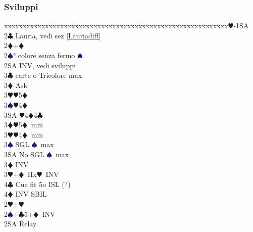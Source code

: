 \documentclass[a4paper,italian]{article}
\newcommand{\BC}{\textcolor{OliveGreen}{$\clubsuit$}}
\newcommand{\BD}{\textcolor{RedOrange}{$\vardiamondsuit$}}
\newcommand{\BH}{\textcolor{Red2}{$\varheartsuit${}}}
\newcommand{\BS}{\textcolor{MidnightBlue}{$\spadesuit${}}}
\newenvironment{bidtable}
{\begin{tabbing}

    xxxxxx\=xxxxxx\=xxxxxx\=xxxxxx\=xxxxxx\=xxxxxx\=xxxxxx\=xxxxxx\=xxxxxx\=xxxxxx\=\kill}
{\end{tabbing} }%
\begin{document}
\begin{multicols*}{2}
                                        \subsubsection{Sviluppi}
                                        \begin{bidtable}
                                            1\BH-1SA\\
                                            2\BC\> Lauria, vedi sez \ref{Lauriadiff}\\
                                            2\BD {}+\BD \+\\
                                            2\BS {}° colore senza fermo \BS \\
                                            2SA \> INV, vedi sviluppi\+\\
                                            3\BC {} carte o Tricolore max\+\\
                                            3\BD \> Ask\+\\
                                            3\BH {}\BH 5\BD \\
                                            3\BS {}\BH 4\BD \\
                                            3SA \BH 4\BD 4\BC \-\-\\
                                            3\BD {}\BH 5\BD\ min\\
                                            3\BH {}\BH 4\BD\ min\\
                                            3\BS \> SGL \BS\ max\\
                                            3SA \> No SGL \BS\ max\-\\
                                            3\BD \> INV\\
                                            3\BH {}+\BD\ Hx\BH\ INV\\
                                            4\BC \> Cue fit 5o ISL (?)\\
                                            4\BD \> INV SBIL\-\\
                                            2\BH {}+\BH \+\\
                                            2\BS {}+\BC 5+\BD\ INV\+\\
                                            2SA \> Relay\+\\

\end{bidtable}
\end{multicols*}
\end{document}
